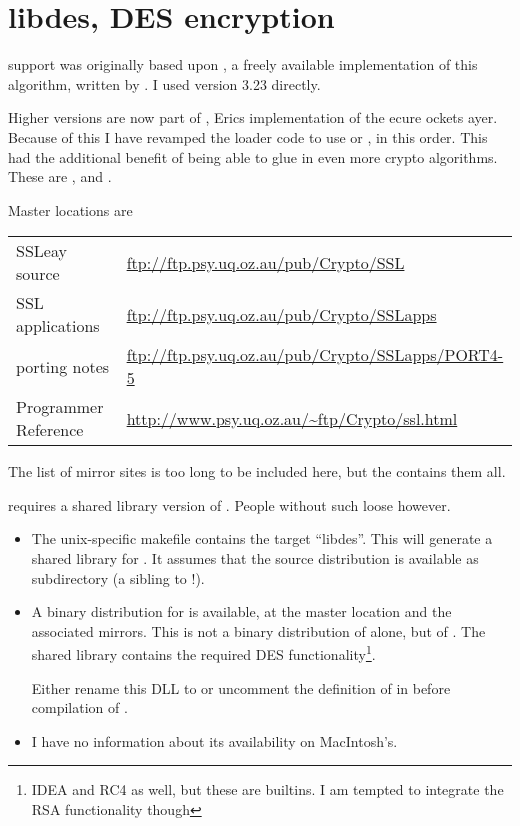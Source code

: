 \documentclass {report}
\begin{document}
\chapter {libdes, DES encryption}\label {libdes}

 support was originally based upon , a freely available
implementation of this algorithm, written by \eay{}. I used version
3.23 directly.

Higher versions are now part of \SSLeay, Erics implementation of
the ecure ockets ayer. Because of this I
have revamped the  loader code to use  or
, in this order. This had the additional benefit of
being able to glue in even more crypto algorithms. These are
,  and .


Master locations are\vspace {1em}

{\small \begin {tabular} {|l|l|}\hline
 SSLeay source       	& \url {ftp://ftp.psy.uq.oz.au/pub/Crypto/SSL}       		\\
 SSL applications	& \url {ftp://ftp.psy.uq.oz.au/pub/Crypto/SSLapps}   		\\
 porting notes		& \url {ftp://ftp.psy.uq.oz.au/pub/Crypto/SSLapps/PORT4-5}	\\
 Programmer Reference	& \url {http://www.psy.uq.oz.au/~ftp/Crypto/ssl.html}		\\ \hline
\end {tabular}}\vspace {1em}

The list of mirror sites is too long to be included here, but the
\ssleayfaq{} contains them all.


\trf{} requires a shared library version of . People
without such  loose however.


\begin {itemize}
\item	The unix-specific makefile contains the target ``libdes''. This
	will generate a shared library for . It assumes that the
	 source distribution is available as subdirectory
	 (a sibling to  !).

\item	A binary distribution for \win{} is available, at the master
	location and the associated mirrors. This is not a binary
	distribution of  alone, but of . The
	shared library  contains the required DES
	functionality\footnote {IDEA and RC4 as well, but these are
	\trf {} builtins. I am tempted to integrate the RSA
	functionality though}.

	Either rename this DLL to  or uncomment the
	definition of  in  before
	compilation of \trf {}.

\item	I have no information about its availability on MacIntosh's.
\end   {itemize}
\end{document}

